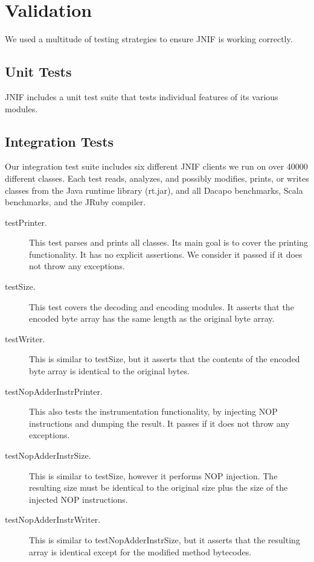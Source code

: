 \section{Validation}
\label{sec:jnif-test}

We used a multitude of testing strategies to ensure JNIF is working correctly.


\subsection{Unit Tests}

JNIF includes a unit test suite that tests individual features of its various modules.

\subsection{Integration Tests}

Our integration test suite includes six different JNIF clients we run on over 40000 different classes.
Each test reads, analyzes, and possibly modifies, prints, or writes classes from the Java runtime library (rt.jar),
and all Dacapo benchmarks, Scala benchmarks, and the JRuby compiler.

\begin{description}
	\item[testPrinter.] This test parses and prints all classes. Its main goal is to cover the printing functionality. It has no explicit assertions. We consider it passed if it does not throw any exceptions.
	\item[testSize.] This test covers the decoding and encoding modules. It asserts that the encoded byte array has the same length as the original byte array.
	\item[testWriter.] This is similar to testSize, but it asserts that the contents of the encoded byte array is identical to the original bytes.
	\item[testNopAdderInstrPrinter.] This also tests the instrumentation functionality, by injecting NOP instructions and dumping the result. It passes if it does not throw any exceptions.
	\item[testNopAdderInstrSize.] This is similar to testSize, however it performs NOP injection. The resulting size must be identical to the original size plus the size of the injected NOP instructions.
	\item[testNopAdderInstrWriter.] This is similar to testNopAdderInstrSize, but it asserts that the resulting array is identical except for the modified method bytecodes.
\end{description}


